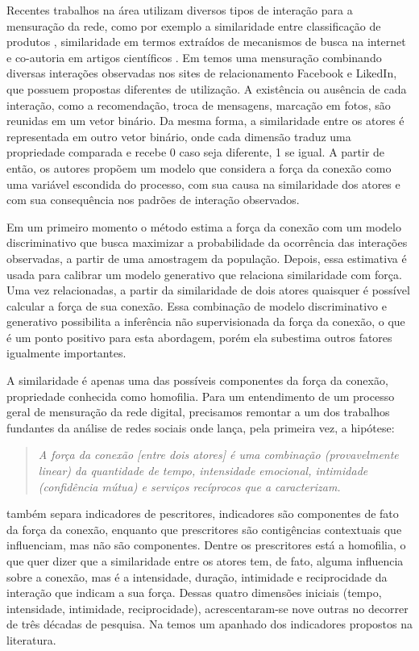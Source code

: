 Recentes trabalhos na área utilizam diversos tipos de interação para a mensuração
da rede, como por exemplo a similaridade entre classificação de produtos
\citep{Richardson2002}, similaridade em termos extraídos de mecanismos de busca
na internet \citep{MATSUO2007} e co-autoria em artigos científicos
\citep{Kempe2003}. Em \citet{Xiang2010} temos uma mensuração combinando diversas
interações observadas nos sites de relacionamento Facebook e LikedIn, que possuem
propostas diferentes de utilização. A existência ou ausência de cada interação,
como a recomendação, troca de mensagens, marcação em fotos, são reunidas em um
vetor binário. Da mesma forma, a similaridade entre os atores é representada em
outro vetor binário, onde cada dimensão traduz uma propriedade comparada e recebe
0 caso seja diferente, 1 se igual. A partir de então, os autores propõem um
modelo que considera a força da conexão como uma variável escondida do processo,
com sua causa na similaridade dos atores e com sua consequência nos padrões de
interação observados.

Em um primeiro momento o método estima a força da conexão com um modelo
discriminativo que busca maximizar a probabilidade da ocorrência das interações
observadas, a partir de uma amostragem da população. Depois, essa estimativa é
usada para calibrar um modelo generativo que relaciona similaridade com força.
Uma vez relacionadas, a partir da similaridade de dois atores quaisquer é
possível calcular a força de sua conexão. Essa combinação de modelo
discriminativo e generativo possibilita a inferência não supervisionada da força
da conexão, o que é um ponto positivo para esta abordagem, porém ela subestima
outros fatores igualmente importantes.

A similaridade é apenas uma das possíveis componentes da força da conexão,
propriedade conhecida como homofilia. Para um entendimento de um processo geral
de mensuração da rede digital, precisamos remontar a um dos trabalhos fundantes
da análise de redes sociais onde \citeauthor{Granovetter1973} lança, pela
primeira vez, a hipótese:

	\begin{quote}{\citep{Granovetter1973}}
	\emph{A força da conexão [entre dois atores] é uma combinação
	(provavelmente linear) da quantidade de tempo, intensidade emocional,
	intimidade (confidência mútua) e serviços recíprocos que a
	caracterizam.} 
	\end{quote}

\citeauthor{Granovetter1973} também separa indicadores de pescritores,
indicadores são componentes de fato da força da conexão, enquanto que
prescritores são contigências contextuais que influenciam, mas não são
componentes. Dentre os prescritores está a homofilia, o que quer dizer que a
similaridade entre os atores tem, de fato, alguma influencia sobre a conexão, mas
é a intensidade, duração, intimidade e reciprocidade da interação que indicam a
sua força. Dessas quatro dimensões iniciais (tempo, intensidade, intimidade,
reciprocidade), acrescentaram-se nove outras no decorrer de três décadas de
pesquisa. Na  temos um apanhado dos indicadores propostos na
literatura.

